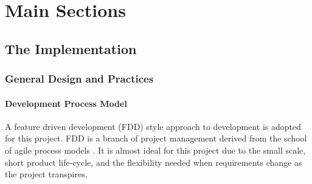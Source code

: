 \chapter{Main Sections}

\section{The Implementation}


\subsection{General Design and Practices}

\subsubsection*{Development Process Model}

\begin{comment}
An extreme programming (XP) style approach to development is adopted for this project. 
Extreme programming is a branch of project management derived from the school of agile process models. 
It is almost ideal for this project due to the small scale, very small development team
(in-fact the team only has one member!), and the flexibility to changing requirements as
the project transpires.

Certain features of the XP approach are not applicable for this project. For example there is no opportunity for 
\end{comment}

A feature driven development (FDD) style approach to development is adopted for this project. 
FDD is a branch of project management derived from the school of agile process models \cite{pracguidefdd}. 
It is almost ideal for this project due to the small scale,  short product life-cycle,
and the flexibility needed when requirements change as the project transpires.
\\

